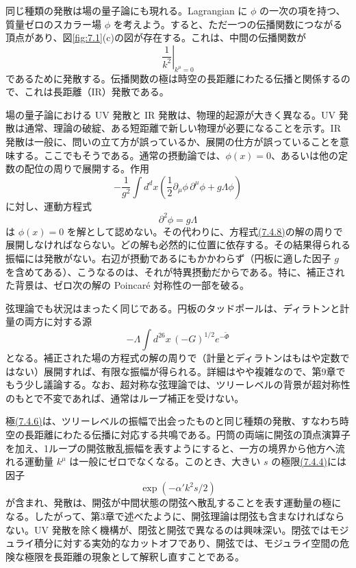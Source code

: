 同じ種類の発散は場の量子論にも現れる。Lagrangian に $\phi$ の一次の項を持つ、質量ゼロのスカラー場 $\phi$ を考えよう。すると、ただ一つの伝播関数につながる頂点があり、図\ref{fig:7.1}(c)の図が存在する。これは、中間の伝播関数が
\begin{equation}
\left.\frac1{k^2}\right|_{k^\mu=0}
\tag{7.4.6}\label{eq:7.4.6}
\end{equation}
であるために発散する。伝播関数の極は時空の長距離にわたる伝播と関係するので、これは長距離（IR）発散である。

場の量子論における UV 発散と IR 発散は、物理的起源が大きく異なる。UV 発散は通常、理論の破綻、ある短距離で新しい物理が必要になることを示す。IR 発散は一般に、問いの立て方が誤っているか、展開の仕方が誤っていることを意味する。ここでもそうである。通常の摂動論では、$\phi(x)=0$、あるいは他の定数の配位の周りで展開する。作用
\begin{equation}
-\frac1{g^2}\int d^dx
\left(\frac12\partial_\mu\phi\,\partial^\mu\phi+g\Lambda\phi\right)
\tag{7.4.7}\label{eq:7.4.7}
\end{equation}
に対し、運動方程式
\begin{equation}
\partial^2\phi=g\Lambda
\tag{7.4.8}\label{eq:7.4.8}
\end{equation}
は $\phi(x)=0$ を解として認めない。その代わりに、方程式\hyperref[eq:7.4.8]{(7.4.8)}の解の周りで展開しなければならない。どの解も必然的に位置に依存する。その結果得られる振幅には発散がない。右辺が摂動であるにもかかわらず（円板に適した因子 $g$ を含めてある）、こうなるのは、それが特異摂動だからである。特に、補正された背景は、ゼロ次の解の Poincaré 対称性の一部を破る。

弦理論でも状況はまったく同じである。円板のタッドポールは、ディラトンと計量の両方に対する源
\begin{equation}
-\Lambda\int d^{26}x\,(-G)^{1/2}e^{-\tilde\Phi}
\tag{7.4.9}\label{eq:7.4.9}
\end{equation}
となる。補正された場の方程式の解の周りで（計量とディラトンはもはや定数ではない）展開すれば、有限な振幅が得られる。詳細はやや複雑なので、第9章でもう少し議論する。なお、超対称な弦理論では、ツリーレベルの背景が超対称性のもとで不変であれば、通常はループ補正を受けない。

極\hyperref[eq:7.4.6]{(7.4.6)}は、ツリーレベルの振幅で出会ったものと同じ種類の発散、すなわち時空の長距離にわたる伝播に対応する共鳴である。円筒の両端に開弦の頂点演算子を加え、1ループの開弦散乱振幅を表すようにすると、一方の境界から他方へ流れる運動量 $k^\mu$ は一般にゼロでなくなる。このとき、大きい $s$ の極限\hyperref[eq:7.4.4]{(7.4.4)}には因子
\begin{equation}
\exp(-\alpha'k^2s/2)
\tag{7.4.10}\label{eq:7.4.10}
\end{equation}
が含まれ、発散は、開弦が中間状態の閉弦へ散乱することを表す運動量の極になる。したがって、第3章で述べたように、開弦理論は閉弦も含まなければならない。UV 発散を除く機構が、閉弦と開弦で異なるのは興味深い。閉弦ではモジュライ積分に対する実効的なカットオフであり、開弦では、モジュライ空間の危険な極限を長距離の現象として解釈し直すことである。


